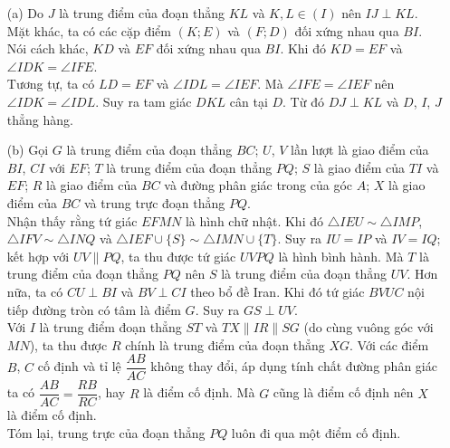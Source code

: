     \begin{solution}
        \hfill
        \begin{itemize}
            \item[(a)] Do \(J\) là trung điểm của đoạn thẳng \(KL\) và \(K, L \in (I)\) nên \(IJ \perp KL\).\\
            Mặt khác, ta có các cặp điểm \((K;E)\) và \((F;D)\) đối xứng nhau qua \(BI\). Nói cách khác, \(KD\) và \(EF\) đối xứng nhau qua \(BI\). Khi đó \(KD = EF\) và \(\angle IDK = \angle IFE\).\\
            Tương tự, ta có \(LD = EF\) và \(\angle IDL = \angle IEF\). Mà \(\angle IFE = \angle IEF\) nên \(\angle IDK = \angle IDL\). Suy ra tam giác \(DKL\) cân tại \(D\). Từ đó \(DJ \perp KL\) và \(D\), \(I\), \(J\) thẳng hàng.
            \item[(b)] Gọi \(G\) là trung điểm của đoạn thẳng \(BC\); \(U\), \(V\) lần lượt là giao điểm của \(BI\), \(CI\) với \(EF\); \(T\) là trung điểm của đoạn thẳng \(PQ\); \(S\) là giao điểm của \(TI\) và \(EF\); \(R\) là giao điểm của \(BC\) và đường phân giác trong của góc \(A\); \(X\) là giao điểm của \(BC\) và trung trực đoạn thẳng \(PQ\).\\
            Nhận thấy rằng tứ giác \(EFMN\) là hình chữ nhật. Khi đó \(\triangle IEU \sim \triangle IMP\), \(\triangle IFV \sim \triangle INQ\) và \(\triangle IEF \cup \{S\} \sim \triangle IMN \cup \{T\}\). Suy ra \(IU = IP\) và \(IV = IQ\); kết hợp với \(UV \parallel PQ\), ta thu được tứ giác \(UVPQ\) là hình bình hành. Mà \(T\) là trung điểm của đoạn thẳng \(PQ\) nên \(S\) là trung điểm của đoạn thẳng \(UV\). Hơn nữa, ta có \(CU \perp BI\) và \(BV \perp CI\) theo bổ đề Iran. Khi đó tứ giác \(BVUC\) nội tiếp đường tròn có tâm là điểm \(G\). Suy ra \(GS \perp UV\).\\
            Với \(I\) là trung điểm đoạn thẳng \(ST\) và \(TX \parallel IR \parallel SG\) (do cùng vuông góc với \(MN\)), ta thu được \(R\) chính là trung điểm của đoạn thẳng \(XG\). Với các điểm \(B\), \(C\) cố định và tỉ lệ \(\dfrac{AB}{AC}\) không thay đổi, áp dụng tính chất đường phân giác ta có \(\dfrac{AB}{AC} = \dfrac{RB}{RC}\), hay \(R\) là điểm cố định. Mà \(G\) cũng là điểm cố định nên \(X\) là điểm cố định.\\
            Tóm lại, trung trực của đoạn thẳng \(PQ\) luôn đi qua một điểm cố định.
        \end{itemize}
    \end{solution}
    

